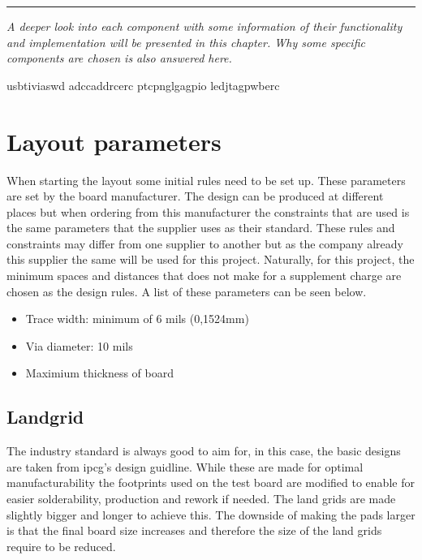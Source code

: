 
\vspace{-10ex}%
\rule{\textwidth}{0.3pt}
\vspace{5ex}

\textit{
A deeper look into each component with some information of their functionality and implementation will be presented in this chapter. Why some specific components are chosen is also answered here. 
}
\vspace{5ex}

\gls{usb}\gls{ti}\gls{via}\gls{swd} \gls{adc}\gls{cad}\gls{drc}\gls{erc} 
\gls{ptc}\gls{png}\gls{lga}\gls{gpio} \gls{led}\gls{jtag}\gls{pwb}\gls{erc}

\section{Layout parameters}

When starting the layout some initial rules need to be set up. These parameters are set by the board manufacturer.
The design can be produced at different places but when ordering from this manufacturer the constraints that are used is the same parameters that the supplier uses as their standard.
These rules and constraints may differ from one supplier to another but as the company already this supplier the same will be used for this project.
Naturally, for this project, the minimum spaces and distances that does not make for a supplement charge are chosen as the design rules. A list of these parameters can be seen below.

\begin{itemize}
\item Trace width: minimum of 6 mils (0,1524mm) 
\item Via diameter: 10 mils
\item Maximium thickness of board

\end{itemize}
 
\subsection{Landgrid}
The industry standard is always good to aim for, in this case, the basic designs are taken from \gls{ipcg}'s design guidline\cite{ipcg}. While these are made for optimal manufacturability the footprints used on the test board are modified to enable for easier solderability, production and rework if needed. The land grids are made slightly bigger and longer to achieve this. The downside of making the pads larger is that the final board size increases and therefore the size of the land grids require to be reduced.

